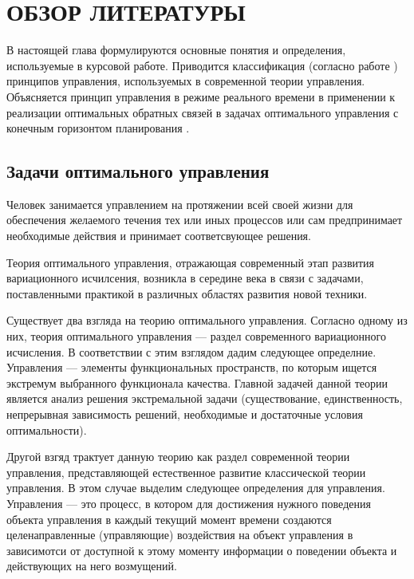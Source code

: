 \chapter{ОБЗОР ЛИТЕРАТУРЫ}\label{chap1}
В настоящей глава формулируются основные понятия и определения, используемые в курсовой работе. Приводится классификация (согласно работе \cite{GabasovKirillovaPU}) принципов управления, используемых в современной теории управления. Объясняется принцип управления в режиме реального времени в применении к реализации оптимальных обратных связей в задачах оптимального управления с конечным горизонтом планирования \cite{GabasovDmitrukKirillova15a}.


\section{Задачи оптимального управления}\label{1sec:optimal-control}
Человек занимается управлением на протяжении всей своей жизни для обеспечения желаемого течения тех или иных процессов или сам предпринимает необходимые действия и принимает соответсвующее решения.

Теория оптимального управления, отражающая современный этап развития вариационного исчилсения, возникла в середине  века в связи с задачами, поставленными практикой в различных областях развития новой техники.

Существует два взгляда на теорию оптимального управления. Согласно одному из них, теория оптимального управления — раздел современного вариационного исчисления. В соответствии с этим взглядом дадим следующее определние.
Управления — элементы функциональных пространств, по которым ищется экстремум выбранного функционала качества. Главной задачей данной теории является анализ решения экстремальной задачи (существование, единственность, непрерывная зависимость решений, необходимые и достаточные условия оптимальности).

Другой взгяд трактует данную теорию как раздел современной теории управления, представляющей естественное развитие классической теории управления. В этом случае выделим следующее определения для управления. Управления — это процесс, в котором для достижения нужного поведения объекта управления в каждый текущий момент времени создаются целенаправленные (управляющие) воздействия на объект управления в зависимотси от доступной к этому моменту информации о поведении объекта и действующих на него возмущений.

